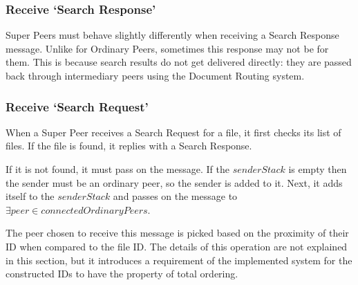 \subsubsection{Receive `Search Response'}

Super Peers must behave slightly differently when receiving a Search Response
message. Unlike for Ordinary Peers, sometimes this response may not be for them.
This is because search results do not get delivered directly: they are passed
back through intermediary peers using the Document Routing system.

\begin{algorithm}[H]

\end{algorithm}

\subsubsection{Receive `Search Request'}

When a Super Peer receives a Search Request for a file, it first checks its list
of files. If the file is found, it replies with a Search Response. 

If it is not found, it must pass on the message. If the $senderStack$ is empty
then the sender must be an ordinary peer, so the sender is added to it.  Next,
it adds itself to the $senderStack$ and passes on the message to $\exists peer
\in connectedOrdinaryPeers$.

The peer chosen to receive this message is picked based on the proximity of
their ID when compared to the file ID.  The details of this operation are not
explained in this section, but it introduces a requirement of the implemented
system for the constructed IDs to have the property of total ordering.

